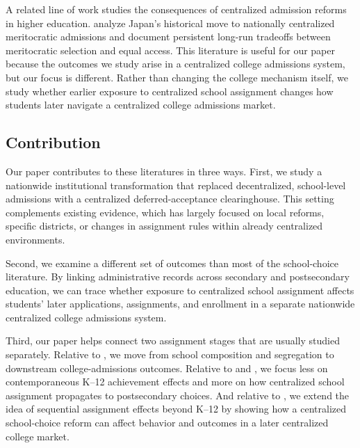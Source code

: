 \documentclass[11pt]{article}
\begin{document}
A related line of work studies the consequences of centralized admission reforms in higher education. \citet{moriguchinaritatanaka2024} analyze Japan's historical move to nationally centralized meritocratic admissions and document persistent long-run tradeoffs between meritocratic selection and equal access. This literature is useful for our paper because the outcomes we study arise in a centralized college admissions system, but our focus is different. Rather than changing the college mechanism itself, we study whether earlier exposure to centralized school assignment changes how students later navigate a centralized college admissions market.

\subsection{Contribution}
Our paper contributes to these literatures in three ways. First, we study a nationwide institutional transformation that replaced decentralized, school-level admissions with a centralized deferred-acceptance clearinghouse. This setting complements existing evidence, which has largely focused on local reforms, specific districts, or changes in assignment rules within already centralized environments.

Second, we examine a different set of outcomes than most of the school-choice literature. By linking administrative records across secondary and postsecondary education, we can trace whether exposure to centralized school assignment affects students' later applications, assignments, and enrollment in a separate nationwide centralized college admissions system.

Third, our paper helps connect two assignment stages that are usually studied separately. Relative to \citet{urzua2023}, we move from school composition and segregation to downstream college-admissions outcomes. Relative to \citet{camposkearns2024} and \citet{terrier2026}, we focus less on contemporaneous K--12 achievement effects and more on how centralized school assignment propagates to postsecondary choices. And relative to \citet{hahmpark2024}, we extend the idea of sequential assignment effects beyond K--12 by showing how a centralized school-choice reform can affect behavior and outcomes in a later centralized college market.



\end{document}
